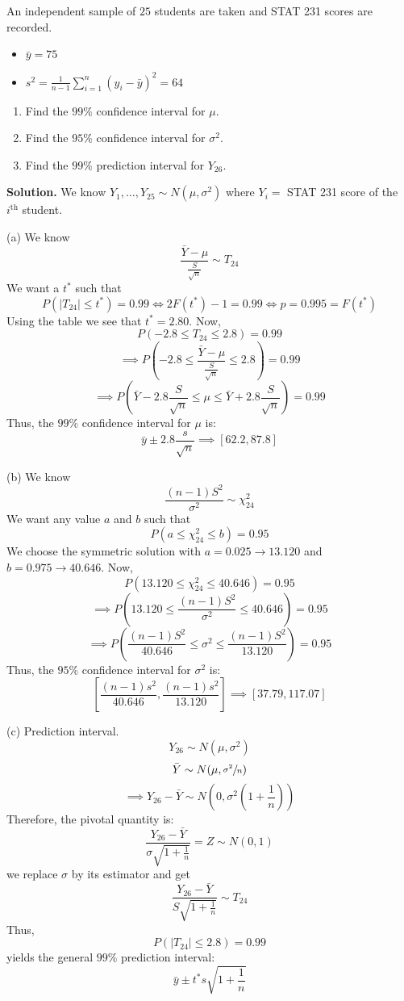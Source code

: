 \begin{Example}{}{}
    An independent sample of $ 25 $ students are taken and STAT 231 scores are recorded.
    \begin{itemize}
        \item $ \bar{y}=75 $
        \item $ s^2=\frac{1}{n-1} \sum\limits_{i=1}^{n} (y_i-\bar{y})^2=64 $
    \end{itemize}
    \begin{enumerate}[label=(\alph*)]
        \item Find the $ 99\% $ confidence interval for $ \mu $.
        \item Find the $ 95\% $ confidence interval for $ \sigma^2 $.
        \item Find the $ 99\% $ prediction interval for $ Y_{26} $.
    \end{enumerate}
    \textbf{Solution.} We know $ Y_1,\ldots ,Y_{25} \sim N(\mu,\sigma^2) $
    where $ Y_i= $ STAT 231 score of the $ i^{\text{th}} $ student.

    (a) We know
    \[ \frac{\bar{Y}-\mu}{\frac{S}{\sqrt{n}}} \sim T_{24} \]
    We want a $ t^* $ such that
    \[ P(|T_{24}|\leqslant t^*)=0.99\iff 2F(t^*)-1=0.99\iff p=0.995=F(t^*) \]
    Using the table we see that $ t^*=2.80 $. Now,
    \[ P(-2.8\leqslant T_{24}\leqslant 2.8)=0.99 \]
    \[ \implies P\left(-2.8\leqslant \frac{\bar{Y}-\mu}{\frac{S}{\sqrt{n}}}
        \leqslant 2.8\right)=0.99 \]
    \[ \implies P\left(\bar{Y}-2.8 \frac{S}{\sqrt{n}}\leqslant \mu\leqslant \bar{Y}+
        2.8 \frac{S}{\sqrt{n}}\right)=0.99 \]
    Thus, the $ 99\% $ confidence interval for $ \mu $ is:
    \[ \bar{y}\pm 2.8 \frac{s}{\sqrt{n}}\implies \left[ 62.2, 87.8 \right] \]

    (b) We know
    \[ \frac{(n-1)S^2}{\sigma^2} \sim \chi^2_{24}  \]
    We want any value $ a $ and $ b $ such that
    \[ P(a\leqslant \chi^2_{24}\leqslant b)=0.95 \]
    We choose the symmetric solution with $ a=0.025\rightarrow 13.120 $ and $ b=0.975\rightarrow 40.646 $.
    Now,
    \[ P\left( 13.120\leqslant \chi^2_{24}\leqslant 40.646 \right)=0.95 \]
    \[ \implies P\left( 13.120\leqslant \frac{(n-1) S^2}{\sigma^2}\leqslant 40.646 \right)=0.95 \]
    \[ \implies P\left( \frac{(n-1)S^2}{40.646}\leqslant \sigma^2 \leqslant \frac{(n-1)S^2}{13.120} \right)=0.95 \]
    Thus, the $ 95\% $ confidence interval for $ \sigma^2 $ is:
    \[ \left[ \frac{(n-1)s^2}{40.646} , \frac{(n-1)s^2}{13.120} \right]\implies
        \left[ 37.79, 117.07 \right] \]

    (c) Prediction interval.
    \[ Y_{26} \sim N(\mu,\sigma^2) \]
    \[ \bar{Y} \sim N(\mu,\sfrac{\sigma^2}{n}) \]
    \[ \implies Y_{26}-\bar{Y} \sim N\left(0,\sigma^2\left( 1+\frac{1}{n}  \right)\right) \]
    Therefore, the pivotal quantity is:
    \[ \frac{Y_{26}-\bar{Y}}{\sigma \sqrt{1+\frac{1}{n}}} =Z \sim N(0,1) \]
    we replace $ \sigma $ by its estimator and get
    \[ \frac{Y_{26}-\bar{Y}}{S \sqrt{1+\frac{1}{n}}} \sim T_{24} \]
    Thus,
    \[ P(|T_{24}|\leqslant 2.8)=0.99 \]
    yields the general $ 99\% $ prediction interval:
    \[ \bar{y}\pm t^* s \sqrt{1+\frac{1}{n}} \]
\end{Example}

